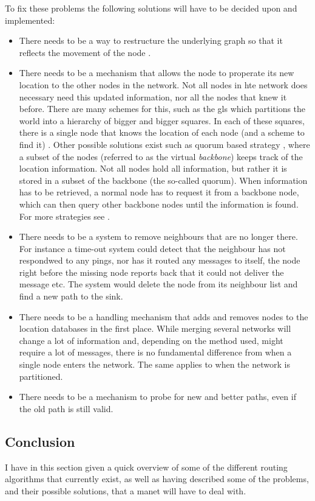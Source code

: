 To fix these problems the following solutions will have to be decided upon and implemented:
\begin{itemize}
\item There needs to be a way to restructure the underlying graph so that it reflects the movement of the node \cite{practical}.
\item There needs to  be a mechanism that allows the node to properate its new location to the other nodes in the network. Not all nodes in hte network does necessary need this updated information, nor all the nodes that knew it before. There are many schemes for this, such as the \ac{gls} \cite{scaleLocation} which partitions the world into a hierarchy of bigger and bigger squares. In each of these squares, there is a single node that knows the location of each node (and a scheme to find it) \cite{scaleLocation}. Other possible solutions exist such as quorum based strategy \cite{quorum_basic}, where a subset of the nodes (referred to as the virtual \emph{backbone}) keeps track of the location information. Not all nodes hold all information, but rather it is stored in a subset of the backbone (the so-called quorum). When information has to be retrieved, a normal node has to request it from a backbone node, which can then query other backbone nodes until the information is found. For more strategies see \cite{surveyPosition}.
\item There needs to be a system to remove neighbours that are no longer there. For instance a time-out system could detect that the neighbour has not respondwed to any pings, nor has it routed any messages to itself, the node right before the missing node reports back that it could not deliver the message etc. The system would delete the node from its neighbour list and find a new path to the sink.
\item There needs to be a handling mechanism that adds and removes nodes to the location databases in the first place. While merging several networks will change a lot of information and, depending on the method used, might require a lot of messages, there is no fundamental difference from when a single node enters the network. The same applies to when the network is partitioned. 
\item There needs to be a mechanism to probe for new and better paths, even if the old path is still valid.
\end{itemize}


\subsection{Conclusion}

I have in this section given a quick overview of some of the different routing algorithms that currently exist, as well as having described some of the problems, and their possible solutions, that a \ac{manet} will have to deal with.
